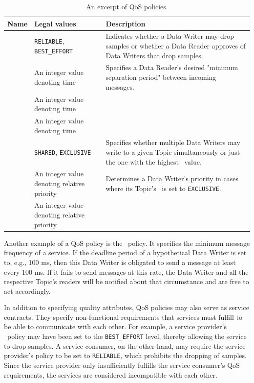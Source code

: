 %
%
%
%
%
\begin{table}[htpb]
  \caption[An excerpt of DDS QoS policies]{An excerpt of QoS policies.}\label{tab:qos}
  \centering
  \begin{tabular}{p{} p{}  p{}}
    \toprule
      \textbf{Name} & \textbf{Legal values} & \textbf{Description} \\
    \midrule
    	\reliability  & \texttt{RELIABLE}, \texttt{BEST\_EFFORT} & Indicates whether a Data Writer may drop samples or whether a Data Reader approves of Data Writers that drop samples.\\
    	\tbf  & An integer value denoting time & Specifies a Data Reader's desired "minimum separation period" between incoming messages.\\
    	\liveliness  & An integer value denoting time &\\
    	\deadline  & An integer value denoting time &\\
    	\ownership  & \texttt{SHARED}, \texttt{EXCLUSIVE} & Specifies whether multiple Data Writers may write to a given Topic simultaneously or just the one with the highest \ostrength\  value.\\
    	\ostrength  & An integer value denoting relative priority & Determines a Data Writer's priority in cases where its Topic's \ownership\ is set to \texttt{EXCLUSIVE}. \\
    	\tpriority  & An integer value denoting relative priority &\\
    \bottomrule
  \end{tabular}
\end{table}
%
%
%
%
%

Another example of a QoS policy is the \deadline\ policy. It specifies the minimum message frequency of a service. If the deadline period of a hypothetical Data Writer is set to, e.g., 100 ms, then this Data Writer is obligated to send a message at least every 100 ms. If it fails to send messages at this rate, the Data Writer and all the respective Topic's readers will be notified about that circumstance and are free to act accordingly.

In addition to specifying quality attributes, QoS policies may also serve as service contracts. They specify non-functional requirements that services must fulfill to be able to communicate with each other. For example, a service provider's \reliability\ policy may have been set to the \texttt{BEST\_EFFORT} level, thereby allowing the service to drop samples. A service consumer, on the other hand, may require the service provider's policy to be set to \texttt{RELIABLE}, which prohibits the dropping of samples. Since the service provider only insufficiently fulfills the service consumer's QoS requirements, the services are considered incompatible with each other.

